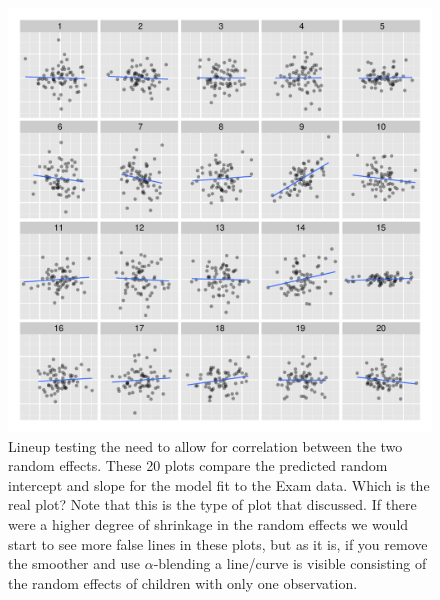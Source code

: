 \documentclass{article} %
\begin{document}
%

\begin{figure}
	\centering
	\includegraphics[width=\textwidth]{normexam_corr_lineup9.pdf}
	\caption{\label{fig:ranef-corr} Lineup testing the need to allow for correlation between the two random effects. These 20 plots compare the predicted random intercept and slope for the model fit to the Exam data. Which is the real plot? Note that this is the type of plot that \cite{Morrell:2000ve} discussed. If there were a higher degree of shrinkage in the random effects we would start to see more false lines in these plots, but as it is, if you remove the smoother and use $\alpha$-blending a line/curve is visible consisting of the random effects of children with only one observation.}
\end{figure}
\end{document}
